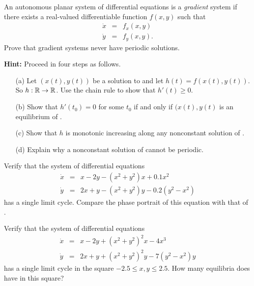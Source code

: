 \documentclass{ximera}
\begin{document}
\begin{exercise} \label{c8.3.5}
An autonomous planar system of differential equations is a {\em gradient\/} 
 system if there exists a real-valued differentiable function 
$f(x,y)$ such that 
\begin{equation} \label{E:gradsys}
\begin{array}{rcl}
\dot{x} & = & f_x(x,y) \\
\dot{y} & = & f_y(x,y).
\end{array}
\end{equation}
Prove that gradient systems never have periodic solutions.  

{\bf Hint:} Proceed in four steps as follows.
\begin{itemize}
\item[(a)]  Let $(x(t),y(t))$ be a solution to  and let 
$h(t)=f(x(t),y(t))$.  So $h:\mbox{$\Bbb{R}$}\to\mbox{$\Bbb{R}$}$.  Use the chain rule to show that 
$h'(t)\geq 0$.
\item[(b)]  Show that $h'(t_0) = 0$ for some $t_0$ if and only if 
$(x(t),y(t)$ is an equilibrium of  .
\item[(c)]  Show that $h$ is monotonic increasing along any nonconstant 
solution of . 
\item[(d)]  Explain why a nonconstant solution of  cannot be 
periodic.
\end{itemize}
\end{exercise}



\CEXER

\begin{exercise} \label{c8.3.2}
Verify that the system of differential equations
\begin{equation*} \label{8.3.2eq} 
\begin{array}{rcl}
\dot{x} & = & x-2y -(x^2+y^2)x + 0.1x^2\\
\dot{y} & = & 2x+y - (x^2+y^2)y - 0.2(y^2-x^2)
\end{array}
\end{equation*}
has a single limit cycle.  Compare the phase portrait of this
equation with that of .
\end{exercise}

\begin{exercise} \label{c8.3.3}
Verify that the system of differential equations
\begin{equation*} \label{8.3.3eq} 
\begin{array}{rcl}
\dot{x} & = & x-2y + (x^2+y^2)^2x - 4x^3\\
\dot{y} & = & 2x+y + (x^2+y^2)^2y - 7(y^2-x^2)y
\end{array}
\end{equation*}
has a single limit cycle in the square $-2.5\leq x,y \leq 2.5$.  How many 
equilibria does  have in this square?  
\end{exercise}
\end{document}
